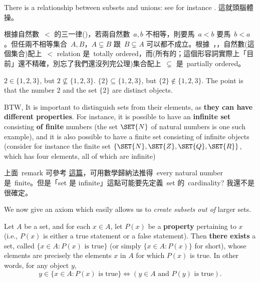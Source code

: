 \begin{remark} \label{remark 3.1.19}
There is a relationship between subsets and unions: see for instance . 這就頭腦體操。
\end{remark}

\begin{remark}  \label{remark 3.1.20}
根據自然數\ \(<\) 的三一律()，若兩自然數\ \(a, b\) 不相等，則要馬\ \(a < b\) 要馬\ \(b < a\)。但任兩不相等集合\ \(A, B\)，\(A \subsetneq B\) 跟\ \(B \subsetneq A\) 可以都不成立。根據\ ，，自然數(這個集合)配上\ \(<\) relation 是\ totally ordered，而(所有的；這個形容詞實際上「目前」還不精確，別忘了我們還沒列完公理)集合配上\ \(\subsetneq\) 是\ partially ordered。
\end{remark}

\begin{remark}  \label{remark 3.1.21}
\(2 \in \{1, 2, 3\}\), but \(2 \not \subseteq \{1, 2, 3\}\). \(\{2\} \subseteq \{1, 2, 3\}\), but \(\{2\} \notin \{1, 2, 3\}\). The point is that the number \(2\) and the set \(\{2\}\) are distinct objects.

BTW, It is important to distinguish sets from their elements, as \textbf{they can have different properties}. For instance, it is possible to have an \textbf{infinite set} consisting \textbf{of finite} numbers (the set \(\SET{N}\) of natural numbers is one such example), and it is also possible to have a finite set consisting of infinite objects (consider for instance the finite set \(\{ \SET{N}, \SET{Z} , \SET{Q} , \SET{R} \} \), which has four elements, all of which are infinite)
\end{remark}

\begin{note}
上面\ remark 可參考 \href{https://math.stackexchange.com/questions/851599/why-set-of-natural-numbers-is-infinite-while-each-natural-number-is-finite}{這篇}，可用數學歸納法推得\ every natural number 是\ finite。但是「set 是 infinite」這點可能要先定義\ set 的\ cardinality? 我還不是很確定。
\end{note}

\begin{note}
We now give an axiom which easily allows us to \emph{create subsets out of} larger sets.
\end{note}

\begin{axiom}  \label{axm 3.5}
Let \(A\) be a set, and for each \(x \in A\), let \(P(x)\) be a \textbf{property} pertaining to \(x\) (i.e., \(P(x)\) is either a true statement or a false statement). Then \textbf{there exists} a set, called \( \{ x \in A : P(x) \text{\ is true} \} \) (or simply \( \{ x \in A : P(x) \} \) for short), whose elements are precisely the elements \(x\) in \(A\) for which \(P(x)\) is true. In other words, for any object \(y\),
\[
    y \in \{ x \in A : P(x) \text{\ is true} \} \iff (y \in A \text{\ and \(P(y)\) is true}).
\]
\end{axiom}


